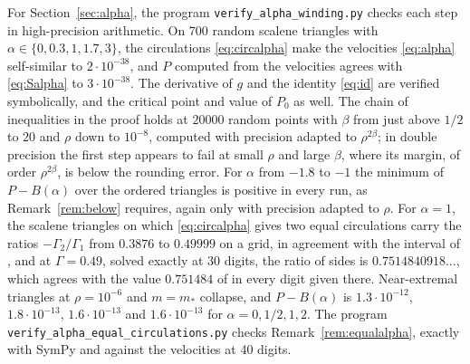 \documentclass[11pt]{article}
\theoremstyle{definition}
\begin{document}
For Section~\ref{sec:alpha}, the program \texttt{verify\_\allowbreak alpha\_\allowbreak winding.py} checks each step in high-precision arithmetic. On 700 random scalene triangles with $\alpha \in \{0, 0.3, 1, 1.7, 3\}$, the circulations \eqref{eq:circalpha} make the velocities \eqref{eq:alpha} self-similar to $2 \cdot 10^{-38}$, and $P$ computed from the velocities agrees with \eqref{eq:Salpha} to $3 \cdot 10^{-38}$. The derivative of $g$ and the identity \eqref{eq:id} are verified symbolically, and the critical point and value of $P_0$ as well. The chain of inequalities in the proof holds at $20000$ random points with $\beta$ from just above $1/2$ to $20$ and $\rho$ down to $10^{-8}$, computed with precision adapted to $\rho^{2\beta}$; in double precision the first step appears to fail at small $\rho$ and large $\beta$, where its margin, of order $\rho^{2\beta}$, is below the rounding error. For $\alpha$ from $-1.8$ to $-1$ the minimum of $P - B(\alpha)$ over the ordered triangles is positive in every run, as Remark~\ref{rem:below} requires, again only with precision adapted to $\rho$. For $\alpha = 1$, the scalene triangles on which \eqref{eq:circalpha} gives two equal circulations carry the ratios $-\Gamma_2/\Gamma_1$ from $0.3876$ to $0.49999$ on a grid, in agreement with the interval of \cite[Lemma~1]{bb2018}, and at $\Gamma = 0.49$, solved exactly at 30 digits, the ratio of sides is $0.7514840918\ldots$, which agrees with the value $0.751484$ of \cite{bb2018} in every digit given there. Near-extremal triangles at $\rho = 10^{-6}$ and $m = m_*$ collapse, and $P - B(\alpha)$ is $1.3\cdot 10^{-12}$, $1.8\cdot 10^{-13}$, $1.6\cdot 10^{-13}$ and $1.6\cdot 10^{-13}$ for $\alpha = 0, 1/2, 1, 2$. The program \texttt{verify\_\allowbreak alpha\_\allowbreak equal\_\allowbreak circulations.py} checks Remark~\ref{rem:equalalpha}, exactly with SymPy and against the velocities at 40 digits.
\end{document}
